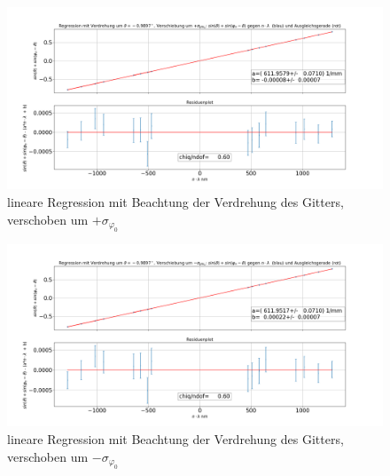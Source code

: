 \documentclass[a4paper, 11pt]{article}
\begin{document}
\begin{figure}[H]
	\hskip-2.5cm
	\includegraphics[scale=0.45]{./Bilder/Gitter_Regression_mit_Verdrehung_+.png}
	\caption{lineare Regression mit Beachtung der Verdrehung des Gitters, verschoben um $+ \sigma_{\varphi_0}$}
	\label{pic:linReg_2_+}	
\end{figure}

\begin{figure}[H]
	\hskip-2.5cm
	\includegraphics[scale=0.45]{./Bilder/Gitter_Regression_mit_Verdrehung_-.png}
	\caption{lineare Regression mit Beachtung der Verdrehung des Gitters, verschoben um $- \sigma_{\varphi_0}$}
	\label{pic:linReg_2_-}	
\end{figure}


\newpage
\listoffigures
\listoftables
\end{document}
